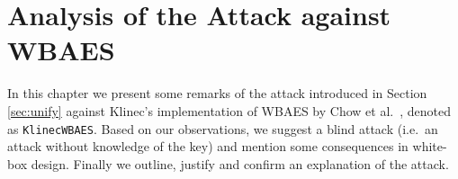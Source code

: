 \chapter{Analysis of the Attack against WBAES}
\label{chap:analysis}

In this chapter we present some remarks of the attack introduced in Section \ref{sec:unify} against Klinec's implementation \cite{klinec2013implementation} of WBAES by Chow et al.\ \cite{chow2002aes}, denoted as {\tt KlinecWBAES}. Based on our observations, we suggest a blind attack (i.e.\ an attack without knowledge of the key) and mention some consequences in white-box design. %
Finally we outline, justify and confirm an explanation of the attack.








